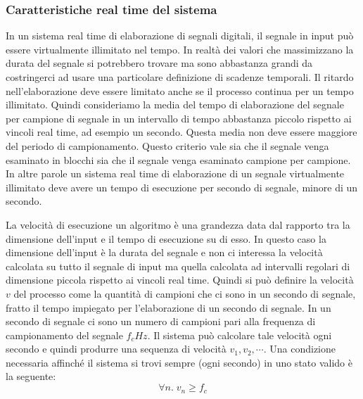 \subsubsection{Caratteristiche real time del sistema}

In un sistema real time di elaborazione di segnali digitali, il segnale in input pu\`o essere virtualmente illimitato nel tempo. In realt\`a dei valori che massimizzano la durata del segnale si potrebbero trovare ma sono abbastanza grandi da costringerci ad usare una particolare definizione di scadenze temporali. 
Il ritardo nell'elaborazione deve essere limitato anche se il processo continua per un tempo illimitato. Quindi consideriamo la media del tempo di elaborazione del segnale per campione di segnale in un intervallo di tempo abbastanza piccolo rispetto ai vincoli real time, ad esempio un secondo. Questa media non deve essere maggiore del periodo di campionamento. Questo criterio vale sia che il segnale venga esaminato in blocchi sia che il segnale venga esaminato campione per campione\cite{RTDSPIA}.
In altre parole un sistema real time di elaborazione di un segnale virtualmente illimitato deve avere un tempo di esecuzione per secondo di segnale, minore di un secondo.


La velocit\`a di esecuzione un algoritmo \`e una grandezza data dal rapporto tra la dimensione dell'input e il tempo di esecuzione su di esso.
In questo caso la dimensione dell'input \`e la durata del segnale e non ci interessa la velocit\`a calcolata su tutto il segnale di input ma quella calcolata ad intervalli regolari di dimensione piccola rispetto ai vincoli real time.
Quindi si pu\`o definire la velocit\`a $v$ del processo come la quantit\`a di campioni che ci sono in un secondo di segnale, fratto il tempo impiegato per l'elaborazione di un secondo di segnale. 
In un secondo di segnale ci sono un numero di campioni pari alla frequenza di campionamento del segnale $f_{c} Hz$.
Il sistema pu\`o calcolare tale velocit\`a ogni secondo e quindi produrre una sequenza di velocit\`a $v_{1}, v_{2}, \cdots $. 
Una condizione necessaria affinch\'e il sistema si trovi sempre (ogni secondo) in uno stato valido \`e la seguente:
\[
  \forall n.\; v_{n} \geq f_{c}
\]


